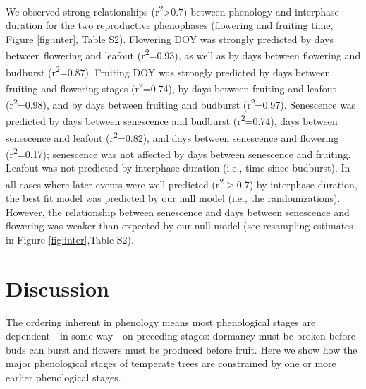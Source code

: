 \documentclass{article}
\begin{document}
\par We observed strong relationships (r\textsuperscript{2}>0.7) between phenology and interphase duration for the two reproductive phenophases (flowering and fruiting time, Figure \ref{fig:inter}, Table S2). Flowering DOY was strongly predicted by days between flowering and leafout (r\textsuperscript{2}=0.93), as well as by days between flowering and budburst (r\textsuperscript{2}=0.87). Fruiting DOY was strongly predicted by days between fruiting and flowering stages (r\textsuperscript{2}=0.74), by days between fruiting and leafout (r\textsuperscript{2}=0.98), and by days between fruiting and budburst (r\textsuperscript{2}=0.97). Senescence was predicted by days between senescence and budburst (r\textsuperscript{2}=0.74), days between senescence and leafout (r\textsuperscript{2}=0.82), and days between senescence and flowering (r\textsuperscript{2}=0.17); senescence was not affected by days between senescence and fruiting.  Leafout was not predicted by interphase duration (i.e., time since budburst). In all cases where later events were well predicted (r\textsuperscript{2}$>$0.7) by interphase duration, the best fit model was predicted by our null model (i.e., the randomizations).  However, the relationship between senescence and days between senescence and flowering was weaker than expected by our null model (see resampling estimates in Figure \ref{fig:inter},Table S2).

\section* {Discussion}
\par The ordering inherent in phenology means most phenological stages are dependent---in some way---on preceding stages: dormancy must be broken before buds can burst and flowers must be produced before fruit. Here we show how the major phenological stages of temperate trees are constrained by one or more earlier phenological stages. 
\end{document}
